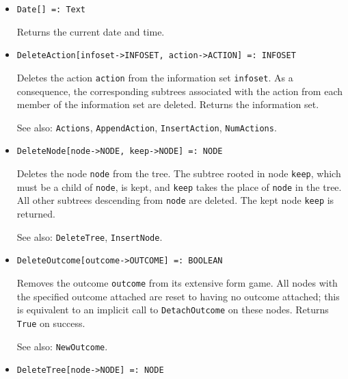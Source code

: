 \begin{itemize}

\item
\protect \large \begin{verbatim}
Date[] =: Text
\end{verbatim}\normalsize

\bd
Returns the current date and time. 
\ed

\item
\protect \large \begin{verbatim}
DeleteAction[infoset->INFOSET, action->ACTION] =: INFOSET
\end{verbatim}\normalsize

\bd
Deletes the action \verb+action+ from the information set
\verb+infoset+.  As a consequence, the corresponding subtrees associated
with the action from each member of the information set are deleted.
Returns the information set.
\item
[See also:] {\tt Actions}, {\tt AppendAction}, {\tt InsertAction},
{\tt NumActions}.
\ed

\item
\protect \large \begin{verbatim}
DeleteNode[node->NODE, keep->NODE] =: NODE
\end{verbatim}\normalsize

\bd
Deletes the node \verb+node+ from the tree.  The
subtree rooted in node \verb+keep+, which must be a child of
\verb+node+, is kept, and \verb+keep+ takes the place of \verb+node+ in
the tree.  All other subtrees descending from \verb+node+ are deleted.
The kept node \verb+keep+ is returned.
\item
[See also:] {\tt DeleteTree}, {\tt InsertNode}.
\ed

\item
\protect \large \begin{verbatim}
DeleteOutcome[outcome->OUTCOME] =: BOOLEAN
\end{verbatim}\normalsize

\bd
Removes the outcome \verb+outcome+ from its extensive
form game.  All nodes with the specified outcome attached are reset to
having no outcome attached; this is equivalent to an implicit call to
{\tt DetachOutcome} on these nodes.  Returns \verb+True+ on success.
\item
[See also:] {\tt NewOutcome}.
\ed

\item
\protect \large \begin{verbatim}
DeleteTree[node->NODE] =: NODE
\end{verbatim}\normalsize


\end{itemize}
